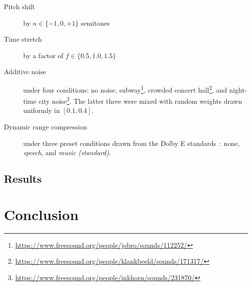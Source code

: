 \documentclass{article}
\begin{document}
\begin{description}
    \item[Pitch shift] by $n \in \{-1, 0, +1\}$ semitones
    \item[Time stretch] by a factor of $f \in \{ 0.5, 1.0, 1.5\}$
    \item[Additive noise] under four conditions: no noise,
        subway\footnote{\url{https://www.freesound.org/people/jobro/sounds/112252/}},
        crowded concert hall\footnote{\url{https://www.freesound.org/people/klankbeeld/sounds/171317/}},
        and night-time city noise\footnote{\url{https://www.freesound.org/people/inkhorn/sounds/231870/}}.
        The latter three were mixed with random weights drawn uniformly in $[0.1, 0.4]$.
    \item[Dynamic range compression] under three preset conditions drawn from the {Dolby E}
        standards~\cite{dolbyE}: none, \emph{speech},
        and \emph{music (standard)}.
\end{description}

\subsection{Results}

\section{Conclusion}


\end{document}
